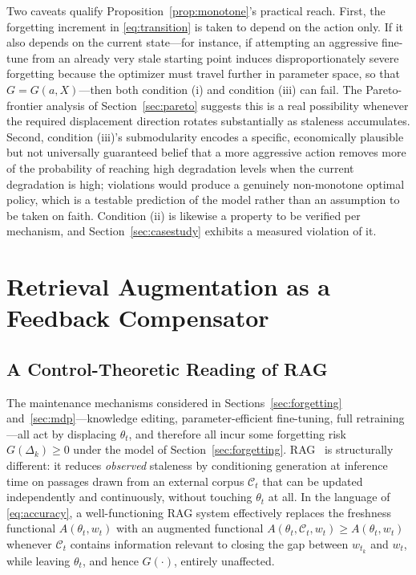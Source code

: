 \documentclass[electronics,article,submit,pdftex,moreauthors]{Definitions/mdpi}
\newcommand{\D}{\varDelta}                 %
\newcommand{\calC}{\mathcal{C}}
\begin{document}
Two caveats qualify Proposition~\ref{prop:monotone}'s practical reach. First, the forgetting increment in \eqref{eq:transition} is taken to depend on the action only. If it also depends on the current state---for instance, if attempting an aggressive fine-tune from an already very stale starting point induces disproportionately severe forgetting because the optimizer must travel further in parameter space, so that $G=G(a,X)$---then both condition (i) and condition (iii) can fail. The Pareto-frontier analysis of Section~\ref{sec:pareto} suggests this is a real possibility whenever the required displacement direction rotates substantially as staleness accumulates. Second, condition (iii)'s submodularity encodes a specific, economically plausible but not universally guaranteed belief that a more aggressive action removes more of the probability of reaching high degradation levels when the current degradation is high; violations would produce a genuinely non-monotone optimal policy, which is a testable prediction of the model rather than an assumption to be taken on faith. Condition (ii) is likewise a property to be verified per mechanism, and Section~\ref{sec:casestudy} exhibits a measured violation of it.

\section{Retrieval Augmentation as a Feedback Compensator}\label{sec:rag}

\subsection{A Control-Theoretic Reading of RAG}\label{sec:ragcontrol}

The maintenance mechanisms considered in Sections~\ref{sec:forgetting} and~\ref{sec:mdp}---knowledge editing, parameter-efficient fine-tuning, full retraining---all act by displacing $\theta_t$, and therefore all incur some forgetting risk $G(\D_k)\ge 0$ under the model of Section~\ref{sec:forgetting}. RAG~\cite{Gao2023} is structurally different: it reduces \textit{observed} staleness by conditioning generation at inference time on passages drawn from an external corpus $\calC_t$ that can be updated independently and continuously, without touching $\theta_t$ at all. In the language of \eqref{eq:accuracy}, a well-functioning RAG system effectively replaces the freshness functional $A(\theta_t,w_t)$ with an augmented functional $A(\theta_t,\calC_t,w_t)\ge A(\theta_t,w_t)$ whenever $\calC_t$ contains information relevant to closing the gap between $w_{t_k}$ and $w_t$, while leaving $\theta_t$, and hence $G(\cdot)$, entirely unaffected.
\end{document}
